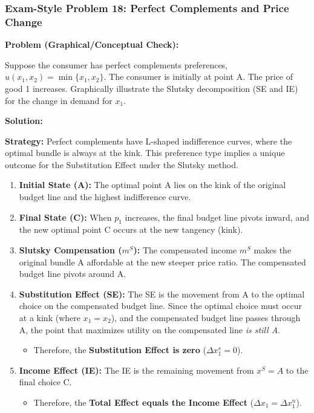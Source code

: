 \documentclass{article}
\begin{document}
\hrulefill

\subsubsection*{Exam-Style Problem 18: Perfect Complements and Price Change}

\textbf{Problem (Graphical/Conceptual Check):}

Suppose the consumer has perfect complements preferences, $u(x_1, x_2) = \min\{x_1, x_2\}$. The consumer is initially at point A. The price of good 1 increases. Graphically illustrate the Slutsky decomposition (SE and IE) for the change in demand for $x_1$.

\vspace{1em}
\textbf{Solution:}

\vspace{1em}
\textbf{Strategy:} Perfect complements have L-shaped indifference curves, where the optimal bundle is always at the kink. This preference type implies a unique outcome for the Substitution Effect under the Slutsky method.

\begin{enumerate}
    \item \textbf{Initial State (A):} The optimal point A lies on the kink of the original budget line and the highest indifference curve.
    \item \textbf{Final State (C):} When $p_1$ increases, the final budget line pivots inward, and the new optimal point C occurs at the new tangency (kink).
    \item \textbf{Slutsky Compensation ($m^S$):} The compensated income $m^S$ makes the original bundle A affordable at the new steeper price ratio. The compensated budget line pivots around A.
    \item \textbf{Substitution Effect (SE):} The SE is the movement from A to the optimal choice on the compensated budget line. Since the optimal choice must occur at a kink (where $x_1=x_2$), and the compensated budget line passes through A, the point that maximizes utility on the compensated line \textit{is still A}.
    \begin{itemize}
        \item Therefore, the \textbf{Substitution Effect is zero} ($\Delta x_1^s = 0$).
    \end{itemize}
    \item \textbf{Income Effect (IE):} The IE is the remaining movement from $x^S=A$ to the final choice C.
    \begin{itemize}
        \item Therefore, the \textbf{Total Effect equals the Income Effect} ($\Delta x_1 = \Delta x_1^n$).
    \end{itemize}
\end{enumerate}
\end{document}
